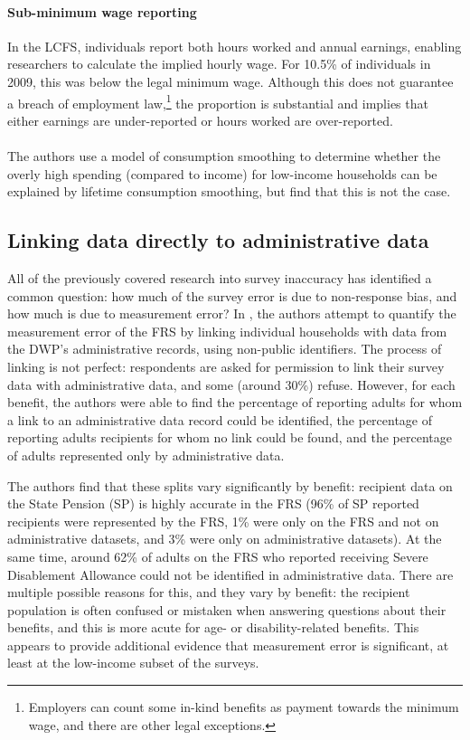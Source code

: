 \documentclass[twocolumn]{article}
\begin{document}
\paragraph{Sub-minimum wage reporting} In the LCFS, individuals report both hours worked and annual earnings, enabling researchers to calculate the implied hourly wage. For 10.5\% of individuals in 2009, this was below the legal minimum wage. Although this does not guarantee a breach of employment law,\footnote{Employers can count some in-kind benefits as payment towards the minimum wage, and there are other legal exceptions.} the proportion is substantial and implies that either earnings are under-reported or hours worked are over-reported.

\paragraph{} The authors use a model of consumption smoothing to determine whether the overly high spending (compared to income) for low-income households can be explained by lifetime consumption smoothing, but find that this is not the case.

\subsection{Linking data directly to administrative data}

All of the previously covered research into survey inaccuracy has identified a common question: how much of the survey error is due to non-response bias, and how much is due to measurement error? In \cite{dwp_110}, the authors attempt to quantify the measurement error of the FRS by linking individual households with data from the DWP's administrative records, using non-public identifiers. The process of linking is not perfect: respondents are asked for permission to link their survey data with administrative data, and some (around 30\%) refuse. However, for each benefit, the authors were able to find the percentage of reporting adults for whom a link to an administrative data record could be identified, the percentage of reporting adults recipients for whom no link could be found, and the percentage of adults represented only by administrative data. 

The authors find that these splits vary significantly by benefit: recipient data on the State Pension (SP) is highly accurate in the FRS (96\% of SP reported recipients were represented by the FRS, 1\% were only on the FRS and not on administrative datasets, and 3\% were only on administrative datasets). At the same time, around 62\% of adults on the FRS who reported receiving Severe Disablement Allowance could not be identified in administrative data. There are multiple possible reasons for this, and they vary by benefit: the recipient population is often confused or mistaken when answering questions about their benefits, and this is more acute for age- or disability-related benefits. This appears to provide additional evidence that measurement error is significant, at least at the low-income subset of the surveys.
\end{document}
